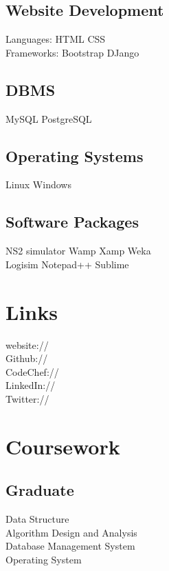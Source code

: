\documentclass[]{deedy-resume-openfont}
\begin{document}
\begin{minipage}[t]{0.33\textwidth}
\subsection{Website Development}
Languages: HTML \textbullet{} CSS \\
Frameworks: Bootstrap \textbullet{} DJango
\sectionsep
\subsection{DBMS}
MySQL \textbullet{} PostgreSQL
\sectionsep
\subsection{Operating Systems}
Linux \textbullet{} Windows
\sectionsep
\subsection{Software Packages}
NS2 simulator \textbullet{} Wamp \textbullet{} Xamp \textbullet{} Weka \\ Logisim \textbullet{} Notepad++ \textbullet{} Sublime 
\sectionsep



\section{Links}
website:// \href{https://diksha-rathi.github.io}{} \\
Github:// \href{https://github.com/Diksha-Rathi}{} \\
CodeChef://  \href{https://www.codechef.com/users/codegirl1995}{} \\
LinkedIn://  \href{https://www.linkedin.com/in/diksharathi}{} \\
Twitter://  \href{https://twitter.com/diksha_28795}{} \\
\sectionsep


\section{Coursework}
\subsection{Graduate}
Data Structure \\
Algorithm Design and Analysis \\
Database Management System \\
Operating System \\
\sectionsep

%
%

\end{minipage} 
\end{document}
